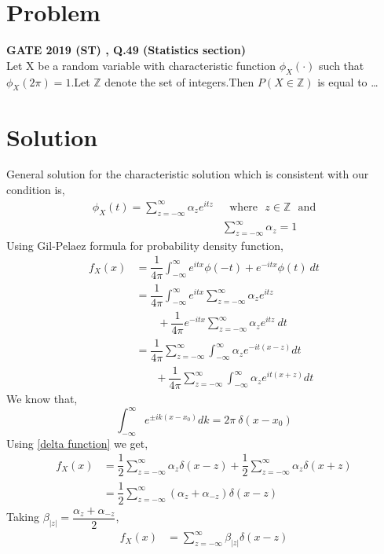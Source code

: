 \documentclass[journal,12pt,twocolumn]{IEEEtran}
\begin{document}
\section{Problem}
\textbf{GATE 2019 (ST) , Q.49 (Statistics section)}\\
   Let X be a random variable with characteristic function $\phi_X(\cdot)$ such that $\phi_X(2 \pi)=1$.Let $\mathds{Z}$ denote the set of integers.Then $P(X \in \mathds{Z})$ is equal to \ldots
\section{Solution}
  General solution for the characteristic solution which is consistent with our condition is,
  \begin{align}
      \phi_X(t)=\sum_{z=-\infty}^{\infty}\alpha_ze^{itz}& \text{~~where~~} z \in \mathds{Z} \text{~~and}\\
      &\sum_{z=-\infty}^{\infty}\alpha_z=1 \label{main condition}
  \end{align}
  Using Gil-Pelaez formula for probability density function,
  \begin{align}
      f_X(x)&=\dfrac{1}{4\pi}\int_{-\infty}^\infty e^{itx}\phi(-t)+e^{-itx}\phi(t)~dt\\
      &=\dfrac{1}{4\pi}\int_{-\infty}^\infty e^{itx}\sum_{z=-\infty}^{\infty}\alpha_ze^{itz}\nonumber\\&~~~~~~~~~+\dfrac{1}{4\pi}e^{-itx}\sum_{z=-\infty}^{\infty}\alpha_ze^{itz}~dt\\
      &=\dfrac{1}{4\pi}\sum_{z=-\infty}^{\infty}\int_{-\infty}^\infty\alpha_ze^{-it(x-z)}dt\nonumber\\&~~~~~~~~+\dfrac{1}{4\pi}\sum_{z=-\infty}^{\infty}\int_{-\infty}^\infty\alpha_ze^{it(x+z)}dt
\end{align}
We know that,
\begin{equation}
    \int_{-\infty}^{\infty}e^{\pm ik(x-x_{0})}dk=2\pi~\delta(x-x_{0}) \label{delta function}
\end{equation}
Using \eqref{delta function} we get,
\begin{align}
     f_X(x) &=\dfrac{1}{2}\sum_{z=-\infty}^{\infty}\alpha_z \delta(x-z)+\dfrac{1}{2}\sum_{z=-\infty}^{\infty}\alpha_z \delta(x+z)\\
     &=\dfrac{1}{2}\sum_{z=-\infty}^{\infty}(\alpha_z+\alpha_{-z})\delta(x-z)
\end{align}
  Taking $\beta_{|z|}=\dfrac{\alpha_z+\alpha_{-z}}{2}$,
  \begin{align}
       f_X(x)&=\sum_{z=-\infty}^{\infty}\beta_{|z|}\delta(x-z)
  \end{align}
\end{document}
